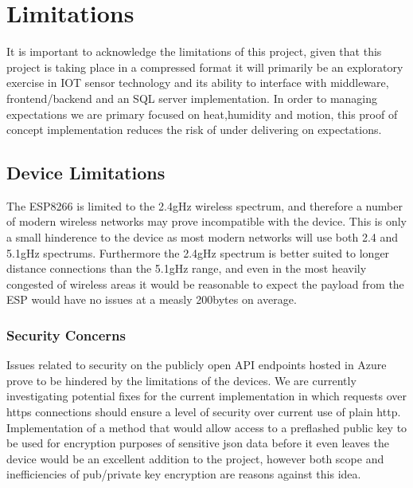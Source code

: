 \documentclass{article}
\newcounter{num}
\begin{document}
        \newpage

    \section{Limitations}
        It is important to acknowledge the limitations of this project, given that this project is taking place 
        in a compressed format it will primarily be an exploratory exercise in IOT sensor technology and its 
        ability to interface with middleware, frontend/backend and an SQL server implementation.
        In order to managing expectations we are primary focused on heat,humidity and motion, this proof of 
        concept implementation reduces the risk of under delivering on expectations.
        
        \subsection{Device Limitations}
            The ESP8266 is limited to the 2.4gHz wireless spectrum, and therefore a number of modern wireless
            networks may prove incompatible with the device. This is only a small hinderence to the device as
            most modern networks will use both 2.4 and 5.1gHz spectrums. Furthermore the 2.4gHz spectrum is 
            better suited to longer distance connections than the 5.1gHz range, and even in the most
            heavily congested of wireless areas it would be reasonable to expect the payload from the ESP would
            have no issues at a measly 200bytes on average.
            
            \subsubsection{Security Concerns}
            Issues related to security on the publicly open API endpoints hosted in Azure prove to be hindered
            by the limitations of the devices. We are currently investigating potential fixes for the current
            implementation in which requests over https connections should ensure a level of security over 
            current use of plain http.
            \\
            Implementation of a method that would allow access to a preflashed public key to be used for encryption
            purposes of sensitive json data before it even leaves the device would be an excellent addition to 
            the project, however both scope and inefficiencies of pub/private key encryption are reasons against
            this idea.
        
\end{document}
